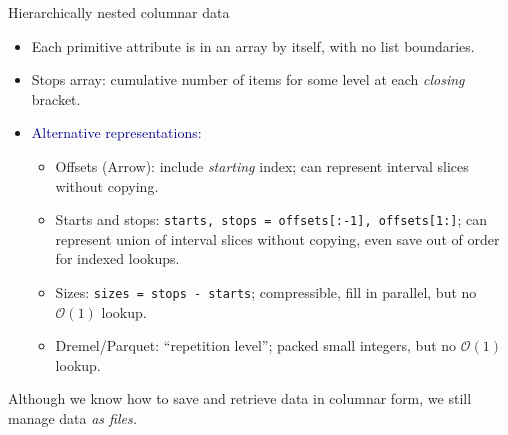 \documentclass[aspectratio=169]{beamer}
\begin{document}
\begin{frame}{Hierarchically nested columnar data}
\begin{itemize}
\item<3-> Each primitive attribute is in an array by itself, with no list boundaries.
\item<4-> Stops array: cumulative number of items for some level at each {\it closing} bracket.
\item<5-> \textcolor{darkblue}{Alternative representations:}
\begin{itemize}
\item<5-> Offsets (Arrow): include {\it starting} index; can represent interval slices without copying.
\item<6-> Starts and stops: {\tt\scriptsize starts, stops = offsets[:-1], offsets[1:]}; can represent union of interval slices without copying, even save out of order for indexed lookups.
\item<7-> Sizes: {\tt\scriptsize sizes = stops - starts}; compressible, fill in parallel, but no $\mathcal{O}(1)$ lookup.
\item<8-> Dremel/Parquet: ``repetition level''; packed small integers, but no $\mathcal{O}(1)$ lookup.
\end{itemize}
\end{itemize}
\end{frame}

\begin{frame}{}
\begin{center}
\begin{minipage}{0.8\linewidth}
\begin{center}
\Large Although we know how to save and retrieve data in columnar form, we still manage data {\it as files.}
\end{center}
\end{minipage}
\end{center}

\vspace{0.5 cm}
\end{frame}
\end{document}
